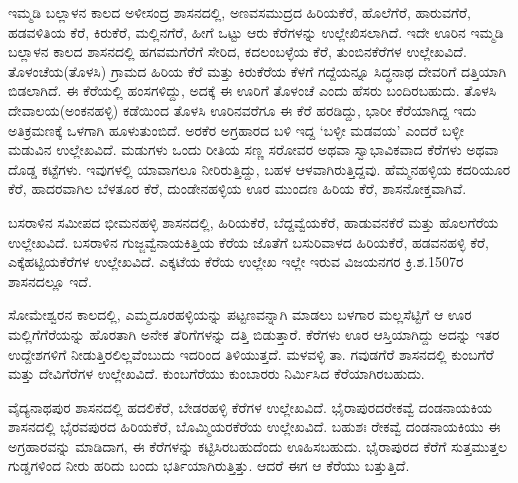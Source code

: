 ಇಮ್ಮಡಿ ಬಲ್ಲಾಳನ ಕಾಲದ ಅಳೀಸಂದ್ರ ಶಾಸನದಲ್ಲಿ, ಅಣವಸಮುದ್ರದ ಹಿರಿಯಕೆರೆ, ಹೊಲೆಗೆರೆ, ಹಾರುವಗೆರೆ, ಹಡವಳಿತಿಯ ಕೆರೆ, ಕಿರುಕೆರೆ, ಮಲ್ಲಿನಗೆರೆ, ಹೀಗೆ ಒಟ್ಟು ಆರು ಕೆರೆಗಳನ್ನು ಉಲ್ಲೇಖಿಸಲಾಗಿದೆ. ಇದೇ ಊರಿನ ಇಮ್ಮಡಿ ಬಲ್ಲಾಳನ ಕಾಲದ ಶಾಸನದಲ್ಲಿ ಹಗವಮಗೆರೆಗೆ ಸೇರಿದ, ಕದಲಂಬಳ್ಳೆಯ ಕೆರೆ, ತುಂಬಿನಕೆರೆಗಳ ಉಲ್ಲೇಖವಿದೆ. ತೊಳಂಚೆಯ(ತೊಳಸಿ) ಗ್ರಾಮದ ಹಿರಿಯ ಕೆರೆ ಮತ್ತು ಕಿರುಕೆರೆಯ ಕೆಳಗೆ ಗದ್ದೆಯನ್ನೂ ಸಿದ್ಧನಾಥ ದೇವರಿಗೆ ದತ್ತಿಯಾಗಿ ಬಿಡಲಾಗಿದೆ. ಈ ಕೆರೆಯಲ್ಲಿ ಹಂಸಗಳಿದ್ದು, ಅದಕ್ಕೆ ಈ ಊರಿಗೆ ತೊಳಂಚೆ ಎಂದು ಹೆಸರು ಬಂದಿರಬಹುದು. ತೊಳಸಿ ದೇವಾಲಯ(ಅಂಕನಹಳ್ಳಿ) ಕಡೆಯಿಂದ ತೊಳಸಿ ಊರಿನವರೆಗೂ ಈ ಕೆರೆ ಹರಡಿದ್ದು, ಭಾರೀ ಕೆರೆಯಾಗಿದ್ದ ಇದು ಅತಿಕ್ರಮಣಕ್ಕೆ ಒಳಗಾಗಿ ಹೂಳುತುಂಬಿದೆ. ಅರಕೆರ ಅಗ್ರಹಾರದ ಬಳಿ ಇದ್ದ ‘ಬಳ್ಳೀ ಮಡವಯ’ ಎಂದರೆ ಬಳ್ಳೀ ಮಡುವಿನ ಉಲ್ಲೇಖವಿದೆ. ಮಡುಗಳು ಒಂದು ರೀತಿಯ ಸಣ್ಣ ಸರೋವರ ಅಥವಾ ಸ್ವಾಭಾವಿಕವಾದ ಕೆರೆಗಳು ಅಥವಾ ದೊಡ್ಡ ಕಟ್ಟೆಗಳು. ಇವುಗಳಲ್ಲಿ ಯಾವಾಗಲೂ ನೀರಿರುತ್ತಿದ್ದು, ಬಹಳ ಆಳವಾಗಿರುತ್ತಿದ್ದವು. ಹೆಮ್ಮನಹಳ್ಳಿಯ ಕದರಿಯೂರ ಕೆರೆ, ಹಾದರವಾಗಿಲ ಬೆಳತೂರ ಕೆರೆ, ದುಂಡೇನಹಳ್ಳಿಯ ಊರ ಮುಂದಣ ಹಿರಿಯ ಕೆರೆ, ಶಾಸನೋಕ್ತವಾಗಿವೆ.

\vskip 2pt

ಬಸರಾಳಿನ ಸಮೀಪದ ಭೀಮನಹಳ್ಳಿ ಶಾಸನದಲ್ಲಿ, ಹಿರಿಯಕೆರೆ, ಬೆದ್ದವ್ವೆಯಕೆರೆ, ಹಾಡುವನಕೆರೆ ಮತ್ತು ಹೊಲಗೆರೆಯ ಉಲ್ಲೇಖವಿದೆ. ಬಸರಾಳಿನ ಗುಜ್ಜವ್ವೆನಾಯಕಿತ್ತಿಯ ಕೆರೆಯ ಜೊತೆಗೆ ಬಸುರಿವಾಳದ ಹಿರಿಯಕೆರೆ, ಹಡವನಹಳ್ಳಿ ಕೆರೆ, ಎಕ್ಕೆಹಟ್ಟಿಯಕೆರೆಗಳ ಉಲ್ಲೇಖವಿದೆ. ಎಕ್ಕಟೆಯ ಕೆರೆಯ ಉಲ್ಲೇಖ ಇಲ್ಲೇ ಇರುವ ವಿಜಯನಗರ ಕ್ರಿ.ಶ.1507ರ ಶಾಸನದಲ್ಲೂ ಇದೆ.

\vskip 2pt

ಸೋಮೇಶ್ವರನ ಕಾಲದಲ್ಲಿ, ಎಮ್ಮದೂರಹಳ್ಳಿಯನ್ನು ಪಟ್ಟಣವನ್ನಾಗಿ ಮಾಡಲು ಬಳಗಾರ ಮಲ್ಲಸೆಟ್ಟಿಗೆ ಆ ಊರ ಮಲ್ಲಿಗೆಗೆರೆಯನ್ನು ಹೊರತಾಗಿ ಅನೇಕ ತೆರಿಗೆಗಳನ್ನು ದತ್ತಿ ಬಿಡುತ್ತಾರೆ. ಕೆರೆಗಳು ಊರ ಆಸ್ತಿಯಾಗಿದ್ದು ಅದನ್ನು ಇತರ ಉದ್ದೇಶಗಳಿಗೆ ನೀಡುತ್ತಿರಲಿಲ್ಲವೆಂಬುದು ಇದರಿಂದ ತಿಳಿಯುತ್ತದೆ. ಮಳವಳ್ಳಿ ತಾ. ಗವುಡಗೆರೆ ಶಾಸನದಲ್ಲಿ ಕುಂಬಗೆರೆ ಮತ್ತು ದೇವಿಗೆರೆಗಳ ಉಲ್ಲೇಖವಿದೆ. ಕುಂಬಗೆರೆಯು ಕುಂಬಾರರು ನಿರ್ಮಿಸಿದ ಕೆರೆಯಾಗಿರಬಹುದು.

ವೈದ್ಯನಾಥಪುರ ಶಾಸನದಲ್ಲಿ ಹದಲಿಕೆರೆ, ಬೇಡರಹಳ್ಳಿ ಕೆರೆಗಳ ಉಲ್ಲೇಖವಿದೆ. ಭೈರಾಪುರದ\break ರೇಕವ್ವೆ ದಂಡನಾಯಕಿಯ ಶಾಸನದಲ್ಲಿ ಭೈರವಪುರದ ಹಿರಿಯಕೆರೆ, ಬೊಮ್ಮಿಯರಕೆರೆಯ ಉಲ್ಲೇಖವಿದೆ. ಬಹುಶಃ ರೇಕವ್ವೆ ದಂಡನಾಯಕಿಯು ಈ ಅಗ್ರಹಾರವನ್ನು ಮಾಡಿದಾಗ, ಈ ಕೆರೆಗಳನ್ನು ಕಟ್ಟಿಸಿರಬಹುದೆಂದು ಊಹಿಸಬಹುದು. ಭೈರಾಪುರದ ಕೆರೆಗೆ ಸುತ್ತಮುತ್ತಲ ಗುಡ್ಡಗಳಿಂದ ನೀರು ಹರಿದು ಬಂದು ಭರ್ತಿಯಾಗಿರುತ್ತಿತ್ತು. ಆದರೆ ಈಗ ಆ ಕೆರೆಯು ಬತ್ತುತ್ತಿದೆ.

